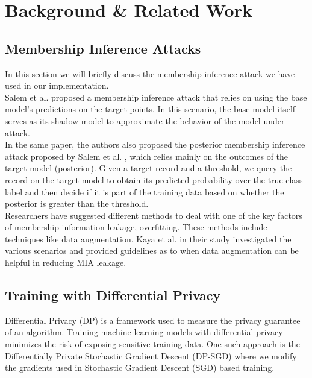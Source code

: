 \documentclass[11pt,letterpaper]{article}
\begin{document}
\section{Background \& Related Work}

\subsection{Membership Inference Attacks}
In this section we will briefly discuss the membership inference attack we have used in our implementation.\\
Salem et al. \cite{salem2018ml} proposed a membership inference attack that relies on using the base model's predictions on the target points. In this scenario, the base model itself serves as its shadow model to approximate the behavior of the model under attack.\\
In the same paper, the authors also proposed the posterior membership inference attack proposed by Salem et al. \cite{salem2018ml}, which relies mainly on the outcomes of the target model (posterior). Given a target record and a threshold, we query the record on the target model to obtain its predicted probability over the true class label and then decide if it is part of the training data based on whether the posterior is greater than the threshold.\\
Researchers have suggested different methods to deal with one of the key factors of membership information leakage, overfitting. These methods include techniques like data augmentation. Kaya et al. \cite{pmlr-v139-kaya21a} in their study investigated the various scenarios and provided guidelines as to when data augmentation can be helpful in reducing MIA leakage. 


\subsection{Training with Differential Privacy}
Differential Privacy (DP) is a framework used to measure the privacy guarantee of an algorithm. Training machine learning models with differential privacy minimizes the risk of exposing sensitive training data.
One such approach is the Differentially Private Stochastic Gradient Descent (DP-SGD) {\cite{abadi2016deep}} where we modify the gradients used in Stochastic Gradient Descent (SGD) based training.\\
\end{document}
